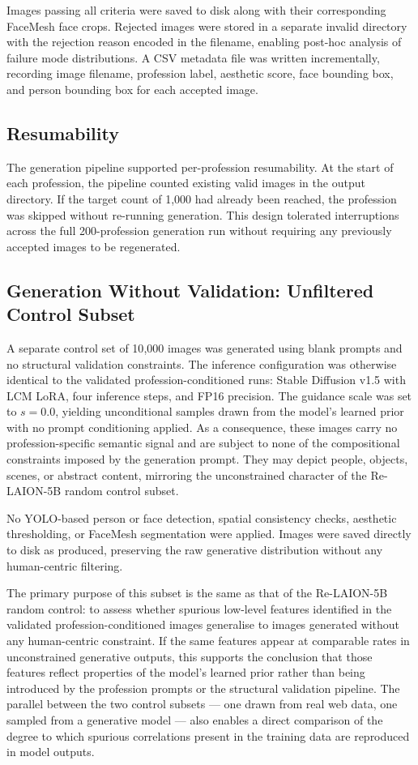 Images passing all criteria were saved to disk along with their corresponding FaceMesh face crops. Rejected images were stored in a separate invalid directory with the rejection reason encoded in the filename, enabling post-hoc analysis of failure mode distributions. A CSV metadata file was written incrementally, recording image filename, profession label, aesthetic score, face bounding box, and person bounding box for each accepted image.

\subsection{Resumability}

The generation pipeline supported per-profession resumability. At the start of each profession, the pipeline counted existing valid images in the output directory. If the target count of 1{,}000 had already been reached, the profession was skipped without re-running generation. This design tolerated interruptions across the full 200-profession generation run without requiring any previously accepted images to be regenerated.

\subsection{Generation Without Validation: Unfiltered Control Subset}

A separate control set of 10{,}000 images was generated using blank prompts and no structural validation constraints. The inference configuration was otherwise identical to the validated profession-conditioned runs: Stable Diffusion v1.5 with LCM LoRA, four inference steps, and FP16 precision. The guidance scale was set to $s = 0.0$, yielding unconditional samples drawn from the model's learned prior with no prompt conditioning applied. As a consequence, these images carry no profession-specific semantic signal and are subject to none of the compositional constraints imposed by the generation prompt. They may depict people, objects, scenes, or abstract content, mirroring the unconstrained character of the Re-LAION-5B random control subset.

No YOLO-based person or face detection, spatial consistency checks, aesthetic thresholding, or FaceMesh segmentation were applied. Images were saved directly to disk as produced, preserving the raw generative distribution without any human-centric filtering.

The primary purpose of this subset is the same as that of the Re-LAION-5B random control: to assess whether spurious low-level features identified in the validated profession-conditioned images generalise to images generated without any human-centric constraint. If the same features appear at comparable rates in unconstrained generative outputs, this supports the conclusion that those features reflect properties of the model's learned prior rather than being introduced by the profession prompts or the structural validation pipeline. The parallel between the two control subsets --- one drawn from real web data, one sampled from a generative model --- also enables a direct comparison of the degree to which spurious correlations present in the training data are reproduced in model outputs.

